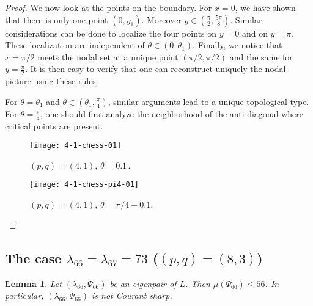 \documentclass[a4paper,reqno,11pt]{amsart}
\newtheorem{lemma}[thm]{Lemma}
\theoremstyle{remark}
\theoremstyle{definition}
\numberwithin{equation}{section}
\begin{document}
\begin{proof}
We now look at the points on the boundary. For $x=0$, we have shown that there 
is only one point $(0,y_1)$. Moreover $y\in ( \frac \pi 2, \frac{5\pi}{8})$. 
Similar considerations can be done to localize the four points on $y=0$ and on 
$y=\pi$. These localization are independent of $\theta \in (0,\theta_1)$. 
Finally, we notice that $x=\pi/ 2$ meets the nodal set at a unique point 
$(\pi / 2,\pi / 2)$  and the same for $y=\frac \pi 2$.
It is then easy to verify that one can reconstruct uniquely  the nodal picture 
using these rules.

For $\theta =\theta_1$ and  $\theta \in (\theta_1,\frac \pi 4)$, similar 
arguments lead to a unique  topological  type.  For $\theta=\frac \pi 4$, one 
should first analyze the neighborhood of the anti-diagonal where critical 
points are present.
\begin{figure}[htbp]
\centering
\texttt{[image: 4-1-chess-01]}
\caption{$(p,q)= (4,1)$, $\theta=0.1\,$.}
\label{fig:4-1-chess-01}
\end{figure}
\begin{figure}[htbp]
\centering
\texttt{[image: 4-1-chess-pi4-01]}
\caption{$(p,q)= (4,1)$, $\theta=\pi/4-0.1$.}
\label{fig:4-1-chess-pi4-01}
\end{figure}
\end{proof}
\newpage

\subsection{The case $\lambda_{66}=\lambda_{67}= 73$ ($(p,q)= (8,3)$)}

\begin{lemma}
\label{lem:8-3}
Let $(\lambda_{66},\Psi_{66})$ be an eigenpair of $L$. Then 
$\mu(\Psi_{66})\leq 56$. In particular, $(\lambda_{66},\Psi_{66})$ is not
Courant sharp.
\end{lemma}
\end{document}
